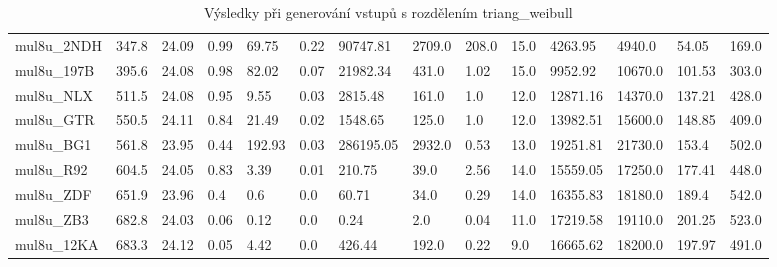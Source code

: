 \begin{landscape}
\begin{table}[!ht]
{\begin{tabular}{|l|l|l|l|l|l|l|l|l|l|l|l|l|l|}
        mul8u\_2NDH & 347.8 & 24.09 & 0.99 & 69.75 & 0.22 & 90747.81 & 2709.0 & 208.0 & 15.0 & 4263.95 & 4940.0 & 54.05 & 169.0 \\ 
        mul8u\_197B & 395.6 & 24.08 & 0.98 & 82.02 & 0.07 & 21982.34 & 431.0 & 1.02 & 15.0 & 9952.92 & 10670.0 & 101.53 & 303.0 \\ 
        mul8u\_NLX & 511.5 & 24.08 & 0.95 & 9.55 & 0.03 & 2815.48 & 161.0 & 1.0 & 12.0 & 12871.16 & 14370.0 & 137.21 & 428.0 \\ 
        mul8u\_GTR & 550.5 & 24.11 & 0.84 & 21.49 & 0.02 & 1548.65 & 125.0 & 1.0 & 12.0 & 13982.51 & 15600.0 & 148.85 & 409.0 \\ 
        mul8u\_BG1 & 561.8 & 23.95 & 0.44 & 192.93 & 0.03 & 286195.05 & 2932.0 & 0.53 & 13.0 & 19251.81 & 21730.0 & 153.4 & 502.0 \\ 
        mul8u\_R92 & 604.5 & 24.05 & 0.83 & 3.39 & 0.01 & 210.75 & 39.0 & 2.56 & 14.0 & 15559.05 & 17250.0 & 177.41 & 448.0 \\ 
        mul8u\_ZDF & 651.9 & 23.96 & 0.4 & 0.6 & 0.0 & 60.71 & 34.0 & 0.29 & 14.0 & 16355.83 & 18180.0 & 189.4 & 542.0 \\ 
        mul8u\_ZB3 & 682.8 & 24.03 & 0.06 & 0.12 & 0.0 & 0.24 & 2.0 & 0.04 & 11.0 & 17219.58 & 19110.0 & 201.25 & 523.0 \\ 
        mul8u\_12KA & 683.3 & 24.12 & 0.05 & 4.42 & 0.0 & 426.44 & 192.0 & 0.22 & 9.0 & 16665.62 & 18200.0 & 197.97 & 491.0 \\ 
    \end{tabular}}
    \caption{Výsledky při generování vstupů s rozdělením triang\_weibull}
    \label{triang_weibull}
\end{table}

\end{landscape}